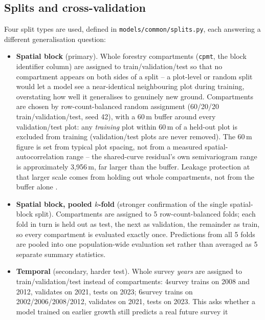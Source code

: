 \subsection{Splits and cross-validation}
\label{sec:splits}

Four split types are used, defined in \texttt{models/common/splits.py}, each answering a
different generalisation question:

\begin{itemize}
\setlength\itemsep{0pt}
\item \textbf{Spatial block} (primary). Whole forestry compartments (\texttt{cpmt}, the block
  identifier column) are assigned to train/validation/test so that no compartment appears on both
  sides of a split -- a plot-level or random split would let a model see a near-identical
  neighbouring plot during training, overstating how well it generalises to genuinely new
  ground. Compartments are chosen by row-count-balanced random assignment (60/20/20
  train/validation/test, seed 42), with a 60\,m buffer around every validation/test plot: any
  \emph{training} plot within 60\,m of a held-out plot is excluded from training (validation/test
  plots are never removed). The 60\,m figure is set from typical plot spacing, not from a
  measured spatial-autocorrelation range -- the shared-curve residual's own semivariogram range is
  approximately 3{,}956\,m, far larger than the buffer. Leakage protection at that larger scale
  comes from holding out whole compartments, not from the buffer alone
  \citep{roberts2017}. %
\item \textbf{Spatial block, pooled $k$-fold} (stronger confirmation of the single spatial-block
  split). Compartments are assigned to 5 row-count-balanced folds; each fold in turn is held out
  as test, the next as validation, the remainder as train, so every compartment is evaluated
  exactly once. Predictions from all 5 folds are pooled into one population-wide evaluation set
  rather than averaged as 5 separate summary statistics.
\item \textbf{Temporal} (secondary, harder test). Whole survey \emph{years} are assigned to
  train/validation/test instead of compartments: 4survey trains on 2008 and 2012, validates on
  2021, tests on 2023; 6survey trains on 2002/2006/2008/2012, validates on 2021, tests on 2023.
  This asks whether a model trained on earlier growth still predicts a real future survey it

\end{itemize}
